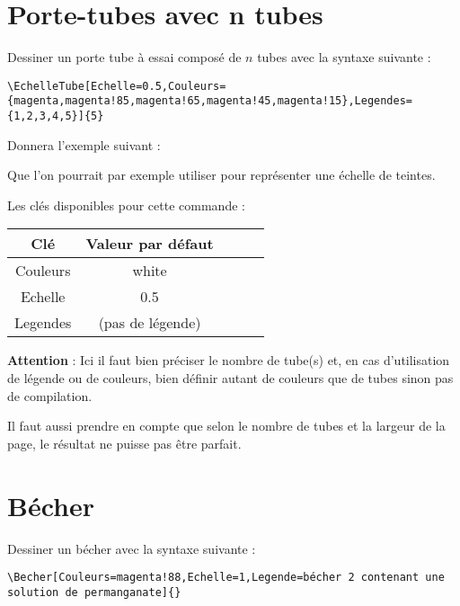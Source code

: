 \documentclass[a4paper,12pt,dvipsnames]{report}
\newcommand{\crh}{\\ \hline}
\newcommand{\important}[1]{%
\vspace{0.5cm}

\begin{imp} 
#1 
\end{imp}
\vspace{0.5cm}%
}
\begin{document}
\section{Porte-tubes avec n tubes}

Dessiner un porte tube à essai composé de $n$ tubes avec la syntaxe suivante :
\vspace{2cm}

\begin{lstlisting}[style=A]
\EchelleTube[Echelle=0.5,Couleurs={magenta,magenta!85,magenta!65,magenta!45,magenta!15},Legendes={1,2,3,4,5}]{5}
\end{lstlisting}
\vspace{2cm}

Donnera l'exemple suivant :

\begin{center}
\end{center}

Que l'on pourrait par exemple utiliser pour représenter une échelle de teintes.


Les clés disponibles pour cette commande :
\begin{center}
\begin{tabularx}{0.5\textwidth}{|C|C|}
\hline 
\textbf{Clé} & \textbf{Valeur par défaut} \crh
Couleurs & white \crh
Echelle & 0.5 \crh
Legendes & {} (pas de légende) \crh
\end{tabularx}
\end{center}

\vspace{0.5cm}

\important{\textbf{Attention} : Ici il faut bien préciser le nombre de tube(s) et, en cas d'utilisation de légende ou de couleurs, bien définir autant de couleurs que de tubes sinon pas de compilation.


Il faut aussi prendre en compte que selon le nombre de tubes et la largeur de la page, le résultat ne puisse pas être parfait.
}
\newpage
\section{Bécher}

Dessiner un bécher avec la syntaxe suivante :
\vspace{2cm}

\begin{lstlisting}[style=A]
\Becher[Couleurs=magenta!88,Echelle=1,Legende=bécher 2 contenant une solution de permanganate]{}
\end{lstlisting}
\vspace{2cm}
\end{document}
